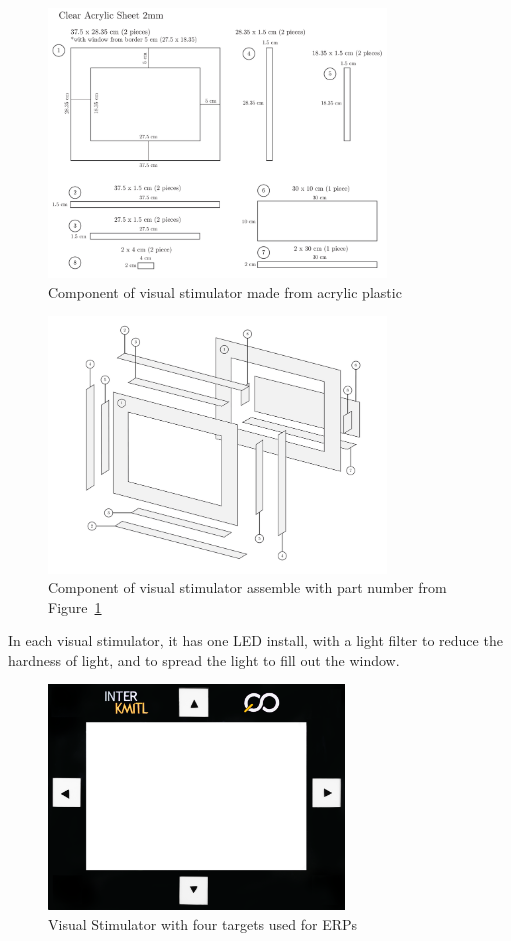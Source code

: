 \begin{figure}[ht]
	\centering
	\includegraphics[width=0.8\textwidth]{chapter6/sch.pdf}
	\caption{Component of visual stimulator made from acrylic plastic}
	\label{fig:sch}
\end{figure}

\begin{figure}[ht]
	\centering
	\includegraphics[width=0.8\textwidth]{chapter6/component.pdf}
	\caption{Component of visual stimulator assemble with part number from Figure~\ref{fig:sch} }
\end{figure}

In each visual stimulator, it has one LED install, with a light filter to reduce the hardness of light, and to spread the light to fill out the window.
\begin{figure}[ht]
	\centering
	\includegraphics[width=0.7\textwidth]{chapter7/frame_4.jpg}
	\caption{Visual Stimulator with four targets used for ERPs}
\end{figure}

